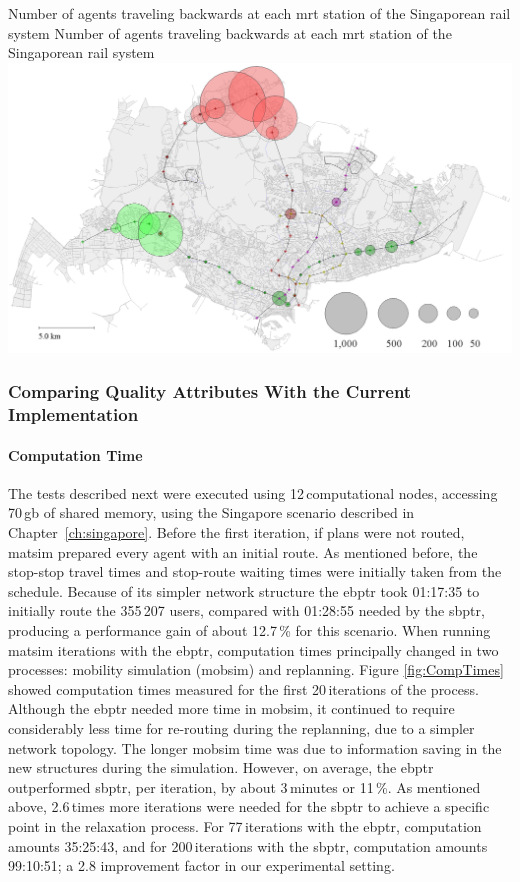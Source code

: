 \createfigure
{Number of agents traveling backwards at each \protect\gls{mrt} station of the Singaporean rail system}
{Number of agents traveling backwards at each \protect\gls{mrt} station of the Singaporean rail system}
{\label{fig:Backwards}}
{\includegraphics[width=1.0\textwidth]{extending/figures/ebr/Backwards.png}}
{}

\subsubsection{Comparing Quality Attributes With the Current Implementation}

\paragraph{Computation Time}

The tests described next were executed using 12\,computational nodes, accessing 70\,\gls{gb} of shared memory, using the Singapore scenario described in Chapter~\ref{ch:singapore}. Before the first iteration, if plans were not routed, \gls{matsim} prepared every agent with an initial route. As mentioned before, the stop-stop travel times and stop-route waiting times were initially taken from the schedule. Because of its simpler network structure the \gls{ebptr} took 01:17:35 to initially route the 355\,207 users, compared with 01:28:55 needed by the \gls{sbptr}, producing a performance gain of about 12.7\,\% for this scenario. When running \gls{matsim} iterations with the \gls{ebptr}, computation times principally changed in two processes: mobility simulation (mobsim) and replanning. Figure \ref{fig:CompTimes} showed computation times measured for the first 20\,iterations of the process. Although the \gls{ebptr} needed more time in \gls{mobsim}, it continued to require considerably less time for re-routing during the replanning, due to a simpler network topology. The longer mobsim time was due to information saving in the new structures during the simulation. However, on average, the \gls{ebptr} outperformed \gls{sbptr}, per iteration, by about 3\,minutes or 11\,\%. As mentioned above, 2.6\,times more iterations were needed for the \gls{sbptr} to achieve a specific point in the relaxation process. For 77\,iterations with the \gls{ebptr}, computation amounts 35:25:43, and for 200\,iterations with the \gls{sbptr}, computation amounts 99:10:51; a 2.8 improvement factor in our experimental setting.

